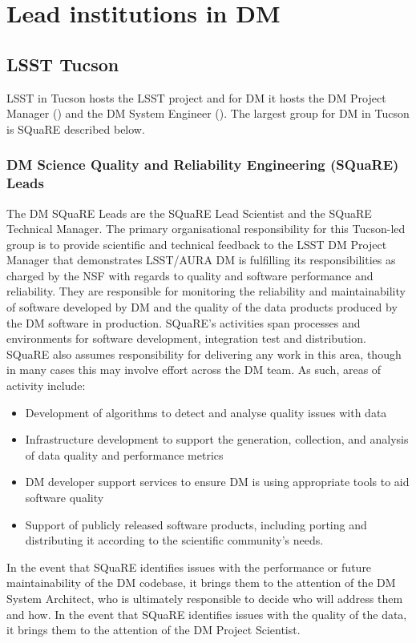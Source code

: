 \section {Lead institutions in DM } \label{sect:leadtutes}
\subsection {LSST Tucson}\label{sect:tucson}
LSST in Tucson hosts the LSST project and for DM it hosts the DM Project Manager () and the DM System Engineer (). The largest group for DM in Tucson is SQuaRE described below.

\subsubsection{DM Science Quality and Reliability Engineering (SQuaRE) Leads \label{sect:square}}
The DM SQuaRE Leads are the SQuaRE Lead Scientist and the SQuaRE Technical Manager.  The primary organisational responsibility for this Tucson-led group is to provide scientific and technical feedback to the LSST DM Project Manager that demonstrates LSST/AURA DM is fulfilling its responsibilities as charged by the NSF with regards to quality and software performance and reliability.
They are responsible for monitoring the reliability and maintainability of software developed by DM and the quality of the data products produced by the DM software in production. SQuaRE's activities span processes and environments for software development, integration test and distribution.  SQuaRE also assumes responsibility for delivering any work in this area, though in many cases this may involve effort across the DM team.
As such, areas of activity include:
\begin{itemize}
	\item Development of algorithms to detect and analyse quality issues with data
	\item Infrastructure development to support the generation, collection, and analysis of data quality and performance metrics
	\item DM developer support services to ensure DM is using appropriate tools to aid software quality
	\item Support of publicly released software products, including porting and distributing it according to the scientific community's needs.
\end{itemize}

In the event that SQuaRE identifies issues with the performance or future maintainability of the DM codebase, it brings them to the attention of the DM System Architect, who is ultimately responsible to decide who will address them and how. In the event that SQuaRE identifies issues with the quality of the data, it brings them to the attention of the DM Project Scientist.


